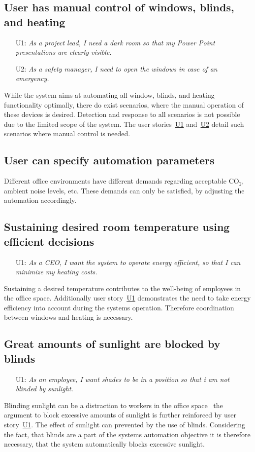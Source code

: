 \documentclass[runningheads]{llncs}
\begin{document}
\subsection{User has manual control of windows, blinds, and heating}
\begin{itemize}
    \item [U1:] \label{r2u1} \textit{As a project lead, I need a dark room so that my Power Point presentations are clearly visible.}
    \item [U2:] \label{r2u2} \textit{As a safety manager, I need to open the windows in case of an emergency.}
\end{itemize}
While the system aims at automating all window, blinds, and heating functionality optimally, there do exist scenarios, where the manual operation of these devices is desired. Detection and response to all scenarios is not possible due to the limited scope of the system. The user stories~\hyperref[r2u1]{U1} and~\hyperref[r2u1]{U2} detail such scenarios where manual control is needed. 

\subsection{User can specify automation parameters}
Different office environments have different demands regarding acceptable CO$_2$, ambient noise levels, etc. These demands can only be satisfied, by adjusting the automation accordingly.

\subsection{Sustaining desired room temperature using efficient decisions}
\begin{itemize}
    \item [U1:] \label{r4u1} \textit{As a CEO, I want the system to operate energy efficient, so that I can minimize my heating costs.}
\end{itemize}
Sustaining a desired temperature contributes to the well-being of employees in the office space. Additionally user story~\hyperref[r4u1]{U1} demonstrates the need to take energy efficiency into account during the systems operation.
Therefore coordination between windows and heating is necessary.

\subsection{Great amounts of sunlight are blocked by blinds}
\begin{itemize}
    \item [U1:] \label{r5u1} \textit{As an employee, I want shades to be in a position so that i am not blinded by sunlight.}
\end{itemize}
Blinding sunlight can be a distraction to workers in the office space~\cite{indoor_noiselight} the argument to block excessive amounts of sunlight is further reinforced by user story~\hyperref[r5u1]{U1}. The effect of sunlight can prevented by the use of blinds. Considering the fact, that blinds are a part of the systems automation objective it is therefore necessary, that the system automatically blocks excessive sunlight.
\end{document}
